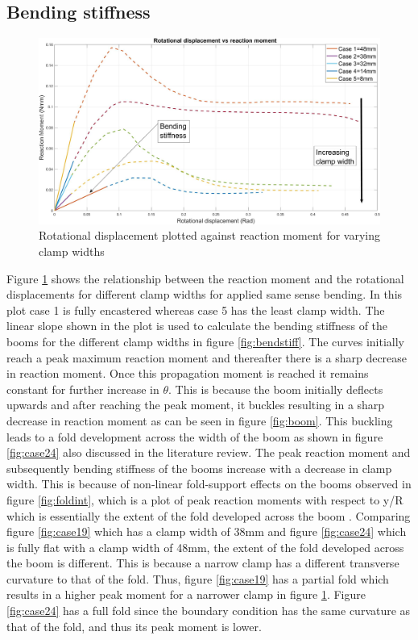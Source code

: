 \subsection{Bending stiffness}
\begin{figure}[!hbt]
    \centering
    \includegraphics[width=15cm]{images/rotdispupdated.jpg}
    \caption{Rotational displacement plotted against reaction moment for varying clamp widths}
    \label{fig:rotdisp}
\end{figure}
Figure \ref{fig:rotdisp} shows the relationship between the reaction moment and the rotational displacements for different clamp widths for applied same sense bending. In this plot case 1 is fully encastered whereas case 5 has the least clamp width. The linear slope shown in the plot is used to calculate the bending stiffness of the booms for the different clamp widths in figure \ref{fig:bendstiff}. The curves initially reach a peak maximum reaction moment and thereafter there is a sharp decrease in reaction moment. Once this propagation moment is reached it remains constant for further increase in $\theta$. This is because the boom initially deflects upwards and after reaching the peak moment, it buckles resulting in a sharp decrease in reaction moment \cite{Seffen1999} as can be seen in figure \ref{fig:boom}. This buckling leads to a fold development across the width of the boom as shown in figure \ref{fig:case24} also discussed in the literature review. 
The peak reaction moment and subsequently bending stiffness of the booms increase with a decrease in clamp width. This is because of non-linear fold-support effects on the booms observed in figure \ref{fig:foldint}, which is a plot of peak reaction moments with respect to y/R which is essentially the extent of the fold developed across the boom \cite{Seffen1999}. Comparing figure \ref{fig:case19} which has a clamp width of 38mm and figure \ref{fig:case24} which is fully flat with a clamp width of 48mm, the extent of the fold developed across the boom is different. This is because a narrow clamp has a different transverse curvature to that of the fold. Thus, figure \ref{fig:case19} has a partial fold which results in a higher peak moment for a narrower clamp in figure \ref{fig:rotdisp}. Figure \ref{fig:case24} has a full fold since the boundary condition has the same curvature as that of the fold, and thus its peak moment is lower.
